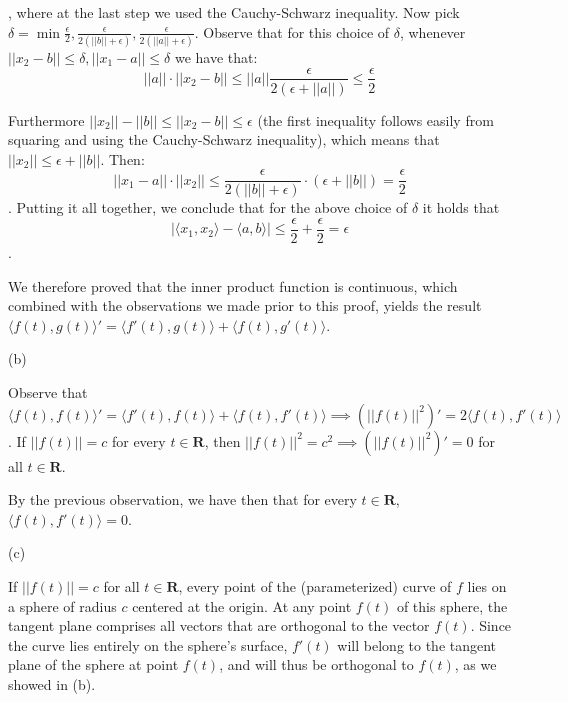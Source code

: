 \begin{solution}
, where at the last step we used the Cauchy-Schwarz inequality. Now pick $\delta = \min{\frac{\epsilon}{2}, \frac{\epsilon}{2(\lvert \lvert b \rvert \rvert + \epsilon)},\frac{\epsilon}{2(\lvert \lvert a \rvert \rvert + \epsilon)}}$. Observe that for this choice of $\delta$, whenever $\lvert \lvert x_2 - b \rvert \rvert \leq \delta, \lvert \lvert x_1 - a \rvert \rvert \leq \delta$ we have that:
$$\lvert \lvert a \rvert \rvert \cdot \lvert \lvert x_2 - b \rvert \rvert \leq \lvert \lvert a \rvert \rvert \frac{\epsilon}{2(\epsilon + \lvert \lvert a \rvert \rvert)} \leq \frac{\epsilon}{2}$$

Furthermore $\lvert \lvert x_2 \rvert \rvert - \lvert \lvert b \rvert \rvert \leq \lvert \lvert x_2 - b \rvert \rvert \leq \epsilon$ (the first inequality follows easily from squaring and using the Cauchy-Schwarz inequality), which means that $\lvert \lvert x_2 \rvert \rvert \leq \epsilon + \lvert \lvert b \rvert \rvert$. Then:
$$\lvert \lvert x_1 - a \rvert \rvert \cdot \lvert \lvert x_2 \rvert \rvert \leq \frac{\epsilon}{2(\lvert \lvert b \rvert \rvert + \epsilon)} \cdot (\epsilon + \lvert \lvert b \rvert \rvert) = \frac{\epsilon}{2}$$. Putting it all together, we conclude that for the above choice of $\delta$ it holds that $$\lvert \langle x_1, x_2 \rangle - \langle a, b \rangle \rvert \leq \frac{\epsilon}{2} + \frac{\epsilon}{2} = \epsilon$$.

We therefore proved that the inner product function is continuous, which combined with the observations we made prior to this proof, yields the result $\langle f(t), g(t) \rangle' = \langle f'(t), g(t) \rangle + \langle f(t), g'(t) \rangle$.

(b)

Observe that $\langle f(t), f(t) \rangle' = \langle f'(t), f(t) \rangle + \langle f(t), f'(t) \rangle \implies (\lvert \lvert f(t) \rvert \rvert^2)' = 2\langle f(t), f'(t) \rangle$. If $\lvert \lvert f(t) \rvert \rvert = c$ for every $t \in \mathbf{R}$, then $\lvert \lvert f(t) \rvert \rvert^2 = c^2 \implies (\lvert \lvert f(t) \rvert \rvert^2)' = 0$ for all $t \in \mathbf{R}$.

By the previous observation, we have then that for every $t \in \mathbf{R}$, $\langle f(t), f'(t) \rangle = 0$.

(c)

If $\lvert \lvert f(t) \rvert \rvert = c$ for all $t \in \mathbf{R}$, every point of the (parameterized) curve of $f$ lies on a sphere of radius $c$ centered at the origin. At any point $f(t)$ of this sphere, the tangent plane comprises all vectors that are orthogonal to the vector $f(t)$. Since the curve lies entirely on the sphere's surface, $f'(t)$ will belong to the tangent plane of the sphere at point $f(t)$, and will thus be orthogonal to $f(t)$, as we showed in (b).
\end{solution}

